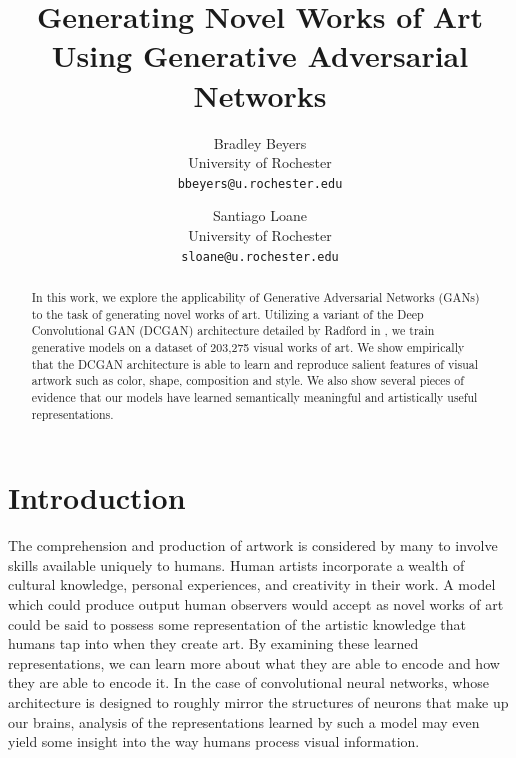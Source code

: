 \documentclass[10pt,twocolumn,letterpaper]{article}
\begin{document}
\title{Generating Novel Works of Art Using Generative Adversarial Networks}

\author{Bradley Beyers\\
	University of Rochester\\
	{\tt\small bbeyers@u.rochester.edu}
	\and
	Santiago Loane\\
	University of Rochester\\
	{\tt\small sloane@u.rochester.edu}
}


\maketitle

\begin{abstract}
   In this work, we explore the applicability of Generative Adversarial Networks (GANs)
   to the task of generating novel works of art. Utilizing a variant of the Deep Convolutional GAN (DCGAN)
   architecture detailed by Radford \etal in \cite{radford2015unsupervised}, we train
   generative models on a dataset of 203,275 visual works of art. We show empirically that the
   DCGAN architecture is able to learn and reproduce salient features of visual artwork such as
   color, shape, composition and style. We also show several pieces of evidence that our models have learned semantically meaningful and artistically useful representations.
\end{abstract}

\section{Introduction}
The comprehension and production of artwork is considered by many to involve skills available
uniquely to humans. Human artists incorporate a wealth of cultural knowledge, personal experiences,
and creativity in their work. A model which could produce output human observers would accept
as novel works of art could be said to possess some representation of the artistic knowledge
that humans tap into when they create art. By examining these learned representations, we can
learn more about what they are able to encode and how they are able to encode it. In the case of convolutional neural networks, whose architecture is designed to roughly mirror the structures of neurons that make up our brains, analysis of the representations learned by such a model may even yield some insight into the way humans process visual information.
\end{document}
